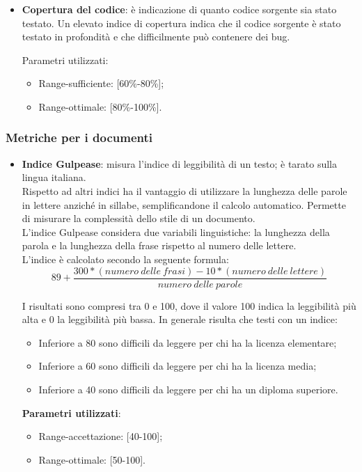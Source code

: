 {{\begin{itemize}
		\[M= 171 -5.2\ln(HV) -0.23(CC) -16.2\ln(LOC) +50.0\sin(\sqrt{2.46*COM})\]

		
		\item \textbf{Copertura del codice}: è indicazione di quanto codice sorgente sia stato testato. Un elevato indice di copertura indica che il codice sorgente è stato testato in profondità e che difficilmente può contenere dei bug.
		
		Parametri utilizzati:
		\begin{itemize}
		\item Range-sufficiente: [60\%-80\%];
		\item Range-ottimale: [80\%-100\%].
		\end{itemize}
	\end{itemize}
	}
\subsubsection{Metriche per i documenti}{
	\label{sec:metricadocumenti}
	\begin{itemize}
		\item \textbf{Indice Gulpease}: misura l'indice di leggibilità di un testo; è tarato sulla lingua italiana.\\
		Rispetto ad altri indici ha il vantaggio di utilizzare la lunghezza delle parole in lettere anziché in sillabe, semplificandone il calcolo automatico. Permette di misurare la complessità dello stile di un documento.\\
		L'indice Gulpease considera due variabili linguistiche: la lunghezza della parola e la lunghezza della frase rispetto al numero delle lettere.\\
		L'indice è calcolato secondo la seguente formula:\\
		
		\[89 + \frac{300 *(numero\ delle\ frasi) -10 *(numero\ delle\ lettere)}{numero\ delle\ parole}\]
		
		I risultati sono compresi tra 0 e 100, dove il valore 100 indica la leggibilità più alta e 0 la leggibilità più bassa. In generale risulta che testi con un indice:
		
		\begin{itemize}
			\item Inferiore a 80 sono difficili da leggere per chi ha la licenza elementare;
			\item Inferiore a 60 sono difficili da leggere per chi ha la licenza media;
			\item Inferiore a 40 sono difficili da leggere per chi ha un diploma superiore.
		\end{itemize}
		
		\textbf{Parametri utilizzati}:
		\begin{itemize}
			\item Range-accettazione: [40-100];
			\item Range-ottimale: [50-100].
		\end{itemize}
	\end{itemize}
	}
}